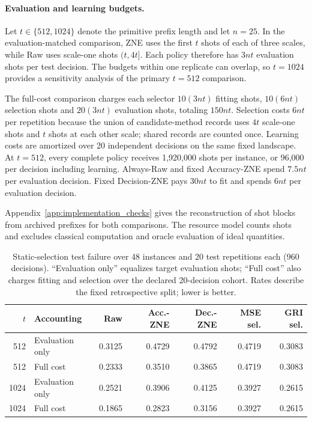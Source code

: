 \documentclass[a4paper,onecolumn,unpublished,nopdfoutputerror]{quantumarticle}
\theoremstyle{plain}
\theoremstyle{definition}
\newcommand{\1}{\mathbf{1}}
\begin{document}
\paragraph{Evaluation and learning budgets.}
Let $t\in\{512,1024\}$ denote the primitive prefix length and let $n=25$. In the evaluation-matched comparison, ZNE uses the first $t$ shots of each of three scales, while Raw uses scale-one shots $(t,4t]$. Each policy therefore has $3nt$ evaluation shots per test decision.
The budgets within one replicate can overlap, so $t=1024$ provides a sensitivity analysis of the primary $t=512$ comparison.

The full-cost comparison charges each selector $10(3nt)$ fitting shots, $10(6nt)$ selection shots and $20(3nt)$ evaluation shots, totaling $150nt$. Selection costs $6nt$ per repetition because the union of candidate-method records uses $4t$ scale-one shots and $t$ shots at each other scale; shared records are counted once. Learning costs are amortized over 20 independent decisions on the same fixed landscape. At $t=512$, every complete policy receives 1,920,000 shots per instance, or 96,000 per decision including learning. Always-Raw and fixed Accuracy-ZNE spend $7.5nt$ per evaluation decision. Fixed Decision-ZNE pays $30nt$ to fit and spends $6nt$ per evaluation decision.

Appendix~\ref{app:implementation_checks} gives the reconstruction of shot blocks from archived prefixes for both comparisons. The resource model counts shots and excludes classical computation and oracle evaluation of ideal quantities.

\begin{table}[!ht]
\centering\small
\caption{Static-selection test failure over 48 instances and 20 test repetitions each (960 decisions). ``Evaluation only'' equalizes target evaluation shots; ``Full cost'' also charges fitting and selection over the declared 20-decision cohort. Rates describe the fixed retrospective split; lower is better.}
\label{tab:e1_reanalysis}
\setlength{\tabcolsep}{4pt}
\begin{tabular}{rlrrrrr}\toprule
$t$ & Accounting & Raw & Acc.-ZNE & Dec.-ZNE & MSE sel. & GRI sel.\\\midrule
512 & Evaluation only & 0.3125 & 0.4729 & 0.4792 & 0.4719 & 0.3083 \\
512 & Full cost & 0.2333 & 0.3510 & 0.3865 & 0.4719 & 0.3083 \\
1024 & Evaluation only & 0.2521 & 0.3906 & 0.4125 & 0.3927 & 0.2615 \\
1024 & Full cost & 0.1865 & 0.2823 & 0.3156 & 0.3927 & 0.2615 \\
\bottomrule\end{tabular}
\end{table}
\end{document}
